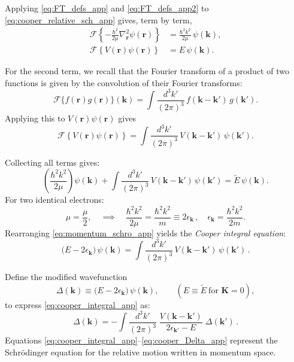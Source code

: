 Applying \eqref{eq:FT_defs_app} and \eqref{eq:FT_defs_app2} to \eqref{eq:cooper_relative_sch_app} gives, term by term,
\begin{align}
\mathcal{F}\!\left\{-\frac{\hbar^2}{2\mu}\nabla_{\mathbf r}^2 \psi(\mathbf r)\right\}
&= \frac{\hbar^2 k^2}{2\mu}\,\psi(\mathbf k), \nonumber \\[4pt]
\mathcal{F}\!\left\{V(\mathbf r)\psi(\mathbf r)\right\}
&=  E\,\psi(\mathbf k). \nonumber
\end{align}


For the second term, we recall that the Fourier transform of a product of two functions is given by the convolution of their Fourier transforms:
\[
\mathcal{F}\{f(\mathbf r)g(\mathbf r)\}(\mathbf k)
= \int\!\frac{d^3k'}{(2\pi)^3}\, f(\mathbf k-\mathbf k')\, g(\mathbf k').
\]
Applying this to \(V(\mathbf r)\psi(\mathbf r)\) gives
\[
\mathcal{F}\!\left\{V(\mathbf r)\psi(\mathbf r)\right\}
= \int\!\frac{d^3k'}{(2\pi)^3}\, V(\mathbf k-\mathbf k')\, \psi(\mathbf k').
\]

Collecting all terms gives:
\begin{equation}
\left(\frac{\hbar^2 k^2}{2\mu}\right)\psi(\mathbf k)
+\int\!\frac{d^3 k'}{(2\pi)^3}\, V(\mathbf k-\mathbf k')\,\psi(\mathbf k')
=\tilde E\,\psi(\mathbf k).
\label{eq:momentum_schro_app}
\end{equation}
For two identical electrons: \[\mu=\frac{\mu}{2} ,\quad \implies \quad \frac{\hbar^2 k^2}{2\mu}=\frac{\hbar^2 k^2}{m}\equiv 2\epsilon_{\mathbf k}\, ,\quad  
\epsilon_{\mathbf k}=\frac{\hbar^2 k^2}{2m}.\]
\noindent Rearranging \eqref{eq:momentum_schro_app} yields the \emph{Cooper integral equation}:
\begin{equation}
\boxed{
\bigl( E-2\epsilon_{\mathbf k}\bigr)\,\psi(\mathbf k)
=\int\!\frac{d^3 k'}{(2\pi)^3}\, V(\mathbf k-\mathbf k')\,\psi(\mathbf k')}\, .
\label{eq:cooper_integral_app}
\end{equation}

Define the modified wavefunction
\[
\Delta(\mathbf k)\equiv \bigl(E-2\epsilon_{\mathbf k}\bigr)\,\psi(\mathbf k),
\qquad (E\equiv \tilde E\ \text{for }\mathbf K=0),
\]
to express \eqref{eq:cooper_integral_app} as:
\begin{equation}
\boxed{
\Delta(\mathbf k) = -\!\int\!\frac{d^3 k'}{(2\pi)^3}\;
\frac{V(\mathbf k-\mathbf k')}{\,2\epsilon_{\mathbf k'}-E\,}\;\Delta(\mathbf k')}\, .
\label{eq:cooper_Delta_app}
\end{equation}
Equations \eqref{eq:cooper_integral_app}–\eqref{eq:cooper_Delta_app} represent the Schrödinger equation for the relative motion written in momentum space.

